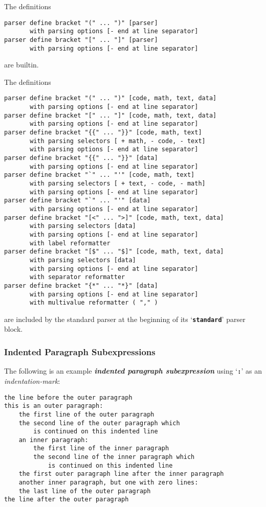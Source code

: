 \documentclass[12pt]{article}
\newcommand{\TT}[1]{{\tt \bfseries #1}}
\newcommand{\key}[1]{{\bf \em #1}\index{#1}}
\newenvironment{indpar}[1][0.3in]%
	{\begin{list}{}%
		     {\setlength{\itemsep}{0in}%
		      \setlength{\topsep}{0in}%
		      \setlength{\parsep}{1ex}%
		      \setlength{\labelwidth}{#1}%
		      \setlength{\leftmargin}{#1}%
		      \addtolength{\leftmargin}{\labelsep}}%
	 \item}%
	{\end{list}}
\begin{document}
The definitions
\begin{indpar}\begin{verbatim}
parser define bracket "(" ... ")" [parser]
       with parsing options [- end at line separator]
parser define bracket "[" ... "]" [parser]
       with parsing options [- end at line separator]
\end{verbatim}\end{indpar}
are builtin.

The definitions
\begin{indpar}\begin{verbatim}
parser define bracket "(" ... ")" [code, math, text, data]
       with parsing options [- end at line separator]
parser define bracket "[" ... "]" [code, math, text, data]
       with parsing options [- end at line separator]
parser define bracket "{{" ... "}}" [code, math, text]
       with parsing selectors [ + math, - code, - text]
       with parsing options [- end at line separator]
parser define bracket "{{" ... "}}" [data]
       with parsing options [- end at line separator]
parser define bracket "`" ... "'" [code, math, text]
       with parsing selectors [ + text, - code, - math]
       with parsing options [- end at line separator]
parser define bracket "`" ... "'" [data]
       with parsing options [- end at line separator]
parser define bracket "[<" ... ">]" [code, math, text, data]
       with parsing selectors [data]
       with parsing options [- end at line separator]
       with label reformatter
parser define bracket "[$" ... "$]" [code, math, text, data]
       with parsing selectors [data]
       with parsing options [- end at line separator]
       with separator reformatter
parser define bracket "{*" ... "*}" [data]
       with parsing options [- end at line separator]
       with multivalue reformatter ( "," )
\end{verbatim}\end{indpar}
are included by the standard parser at the beginning of
its `\TT{standard}' parser block.

\subsubsection{Indented Paragraph Subexpressions}
\label{INDENTED-PARAGRAPH-SUBEXPRESIONS}

The following is an example
\key{indented paragraph subexpression}
using `\TT{:}' as an {\em indentation-mark}:
\begin{indpar}\begin{verbatim}
the line before the outer paragraph
this is an outer paragraph:
    the first line of the outer paragraph
    the second line of the outer paragraph which
        is continued on this indented line
    an inner paragraph:
        the first line of the inner paragraph
        the second line of the inner paragraph which
            is continued on this indented line
    the first outer paragraph line after the inner paragraph
    another inner paragraph, but one with zero lines:
    the last line of the outer paragraph
the line after the outer paragraph
\end{verbatim}\end{indpar}
\end{document}
